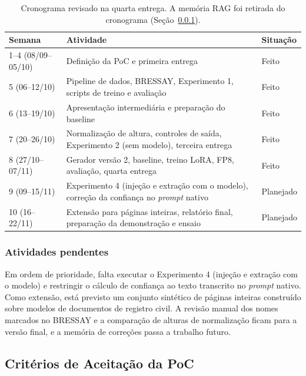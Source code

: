 \documentclass[12pt,a4paper]{article}
\begin{document}
\begin{table}[H]
\centering
\small
\begin{tabular}{@{}lp{9.5cm}l@{}}
\toprule
Semana & Atividade & Situação \\
\midrule
1--4 (08/09--05/10) & Definição da PoC e primeira entrega & Feito \\
5 (06--12/10) & Pipeline de dados, BRESSAY, Experimento 1, scripts de treino e avaliação & Feito \\
6 (13--19/10) & Apresentação intermediária e preparação do baseline & Feito \\
7 (20--26/10) & Normalização de altura, controles de saída, Experimento 2 (sem modelo), terceira entrega & Feito \\
8 (27/10--07/11) & Gerador versão 2, baseline, treino LoRA, FP8, avaliação, quarta entrega & Feito \\
9 (09--15/11) & Experimento 4 (injeção e extração com o modelo), correção da confiança no \emph{prompt} nativo & Planejado \\
10 (16--22/11) & Extensão para páginas inteiras, relatório final, preparação da demonstração e ensaio & Planejado \\
\bottomrule
\end{tabular}
\caption{Cronograma revisado na quarta entrega. A memória RAG foi retirada do cronograma (Seção~\ref{subsec:pendencias}).}
\end{table}

\subsubsection{Atividades pendentes}
\label{subsec:pendencias}
Em ordem de prioridade, falta executar o Experimento 4 (injeção e extração com o modelo) e restringir o cálculo de confiança ao texto transcrito no \emph{prompt} nativo. Como extensão, está previsto um conjunto sintético de páginas inteiras construído sobre modelos de documentos de registro civil. A revisão manual dos nomes marcados no BRESSAY e a comparação de alturas de normalização ficam para a versão final, e a memória de correções passa a trabalho futuro.

\subsection{Critérios de Aceitação da PoC}
\end{document}
